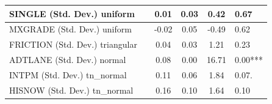 \begin{table}
\begin{center}
\begin{tabular}{|l|l|c|c|c|l|}
			\hline
			SINGLE (Std. Dev.) uniform &  & 0.01 & 0.03 & 0.42 & 0.67 \\
			\hline
			MXGRADE (Std. Dev.) uniform &  & -0.02 & 0.05 & -0.49 & 0.62 \\
			\hline
			FRICTION (Std. Dev.) triangular &  & 0.04 & 0.03 & 1.21 & 0.23 \\
			\hline
			ADTLANE (Std. Dev.) normal &  & 0.08 & 0.00 & 16.71 & 0.00*** \\
			\hline
			INTPM (Std. Dev.) tn_normal &  & 0.11 & 0.06 & 1.84 & 0.07. \\
			\hline
			HISNOW (Std. Dev.) tn_normal &  & 0.16 & 0.10 & 1.64 & 0.10 \\
			\hline
		\end{tabular}
	\end{center}
\end{table}
